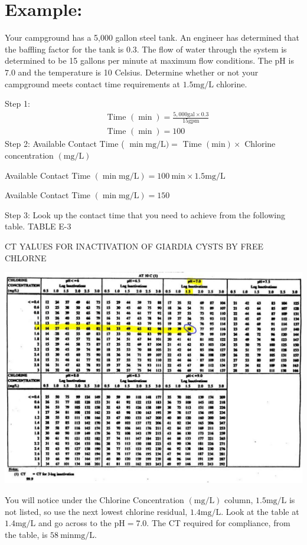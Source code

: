 \documentclass[10pt]{article}
\begin{document}
\section{Example:}
Your campground has a 5,000 gallon steel tank. An engineer has determined that the baffling factor for the tank is $0.3$. The flow of water through the system is determined to be 15 gallons per minute at maximum flow conditions. The pH is $7.0$ and the temperature is 10 Celsius. Determine whether or not your campground meets contact time requirements at $1.5 \mathrm{mg} / \mathrm{L}$ chlorine.

Step 1:
$$
\begin{aligned}
&\text { Time }(\min )=\frac{5,000 \mathrm{gal} \times 0.3}{15 \mathrm{gpm}} \\
&\text { Time }(\min )=100
\end{aligned}
$$
Step 2: Available Contact Time ( $\min \mathrm{mg} / \mathrm{L})=$ Time $(\mathrm{min}) \times$ Chlorine concentration $(\mathrm{mg} / \mathrm{L})$

Available Contact Time $(\min \mathrm{mg} / \mathrm{L})=100 \mathrm{~min} \times 1.5 \mathrm{mg} / \mathrm{L}$

Available Contact Time $(\min \mathrm{mg} / \mathrm{L})=150$

Step 3: Look up the contact time that you need to achieve from the following table. TABLE E-3

CT YALUES FOR INACTIVATION OF GIARDIA CYSTS BY FREE CHLORNE

\includegraphics[max width=\textwidth]{2022_10_14_eba0aec33b37be0fbdf2g-08}

You will notice under the Chlorine Concentration $(\mathrm{mg} / \mathrm{L})$ column, $1.5 \mathrm{mg} / \mathrm{L}$ is not listed, so use the next lowest chlorine residual, $1.4 \mathrm{mg} / \mathrm{L}$. Look at the table at $1.4 \mathrm{mg} / \mathrm{L}$ and go across to the $\mathrm{pH}=7.0$. The CT required for compliance, from the table, is $58 \mathrm{~min} \mathrm{mg} / \mathrm{L}$.
\end{document}
